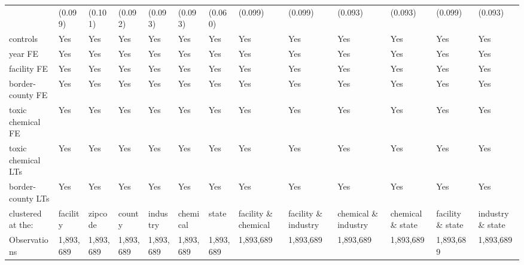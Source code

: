 \begin{table}[H]
{\begin{tabular}{@{}lllllllllllll@{}}
            & (0.099)   & (0.101)   & (0.092)   & (0.093)   & (0.093)   & (0.060)   & (0.099)              & (0.099)              & (0.093)              & (0.093)          & (0.099)          & (0.093)          \\
            controls                            & Yes       & Yes       & Yes       & Yes       & Yes       & Yes       & Yes                  & Yes                  & Yes                  & Yes               & Yes               & Yes               \\
            year FE                             & Yes       & Yes       & Yes       & Yes       & Yes       & Yes       & Yes                  & Yes                  & Yes                  & Yes               & Yes               & Yes               \\
            facility FE                         & Yes       & Yes       & Yes       & Yes       & Yes       & Yes       & Yes                  & Yes                  & Yes                  & Yes               & Yes               & Yes               \\
            border-county FE                    & Yes       & Yes       & Yes       & Yes       & Yes       & Yes       & Yes                  & Yes                  & Yes                  & Yes               & Yes               & Yes               \\
            toxic chemical FE                   & Yes       & Yes       & Yes       & Yes       & Yes       & Yes       & Yes                  & Yes                  & Yes                  & Yes               & Yes               & Yes               \\
            toxic chemical LTs                  & Yes       & Yes       & Yes       & Yes       & Yes       & Yes       & Yes                  & Yes                  & Yes                  & Yes               & Yes               & Yes               \\
            border-county LTs                   & Yes       & Yes       & Yes       & Yes       & Yes       & Yes       & Yes                  & Yes                  & Yes                  & Yes               & Yes               & Yes               \\\midrule
            clustered at the:                   & facility  & zipcode   & county    & industry  & chemical  & state     & facility \& chemical & facility \& industry & chemical \& industry & chemical \& state & facility \& state & industry \& state \\
            Observations                        & 1,893,689 & 1,893,689 & 1,893,689 & 1,893,689 & 1,893,689 & 1,893,689 & 1,893,689            & 1,893,689            & 1,893,689            & 1,893,689         & 1,893,689         & 1,893,689         \\

\end{tabular}}
\end{table}
